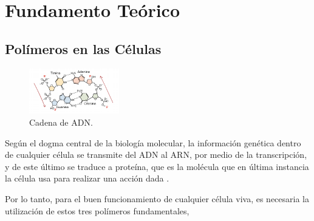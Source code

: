 \documentclass[a4paper,11pt,titlepage]{article}
\theoremstyle{definition}
\begin{document}

\section{Fundamento Teórico}\label{sec:thry}

\subsection{Polímeros en las Células}\label{subsec:polymers}

\begin{figure}
    \begin{center}
      \includegraphics[width=0.35\textwidth]{images/adn.png}
    \end{center}
    \small{\caption{Cadena de ADN.}}\normalsize
    \label{fig:adnchain}
\end{figure}

Según el dogma central de la biología molecular, la información genética dentro de cualquier célula se transmite del ADN al ARN, por medio de la transcripción, y de este último se traduce a proteína, que es la molécula que en última instancia la célula usa para realizar una acción dada \cite{alberts}.

Por lo tanto, para el buen funcionamiento de cualquier célula viva, es necesaria la utilización de estos tres polímeros fundamentales,
\end{document}
